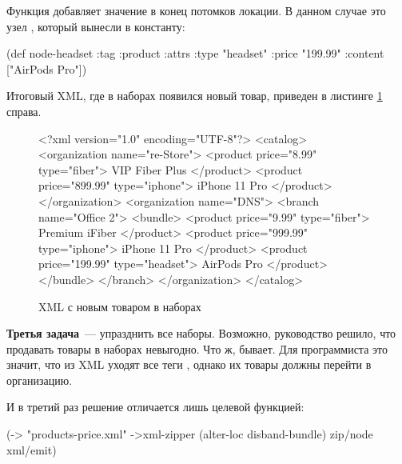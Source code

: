 Функция  добавляет значение в конец потомков локации. В данном
случае это узел , который вынесли в константу:

\begin{english}
  \begin{clojure}
(def node-headset
  {:tag :product
   :attrs {:type "headset"
           :price "199.99"}
   :content ["AirPods Pro"]})
  \end{clojure}
\end{english}

Итоговый XML, где в наборах появился новый товар, приведен в листинге
\ref{fig:chart-xml-03} справа.

\begin{figure}[ht!]

\begin{english}
  \begin{xml}
<?xml version="1.0" encoding="UTF-8"?>
<catalog>
  <organization name="re-Store">
    <product price="8.99" type="fiber">
      VIP Fiber Plus
    </product>
    <product price="899.99" type="iphone">
      iPhone 11 Pro
    </product>
  </organization>
  <organization name="DNS">
    <branch name="Office 2">
      <bundle>
        <product price="9.99" type="fiber">
          Premium iFiber
        </product>
        <product price="999.99" type="iphone">
          iPhone 11 Pro
        </product>
        <product price="199.99" type="headset">
          AirPods Pro
        </product>
      </bundle>
    </branch>
  </organization>
</catalog>
  \end{xml}
\end{english}

\caption{XML с новым товаром в наборах}
\label{fig:chart-xml-03}

\end{figure}

\textbf{Третья задача}~--- упразднить все наборы. Возможно, руководство решило, что
продавать товары в наборах невыгодно. Что ж, бывает. Для программиста это
значит, что из XML уходят все теги , однако их товары должны перейти в
организацию.

И в третий раз решение отличается лишь целевой функцией:

\begin{english}
  \begin{clojure}
(-> "products-price.xml"
    ->xml-zipper
    (alter-loc disband-bundle)
    zip/node
    xml/emit)
  \end{clojure}
\end{english}

